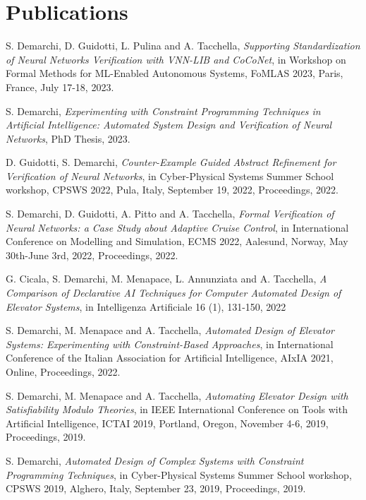\section{\sc Publications}

S. Demarchi, D. Guidotti, L. Pulina and A. Tacchella, 
\textit{Supporting Standardization of Neural Networks Verification
with VNN-LIB and CoCoNet}, in Workshop on Formal Methods for ML-Enabled 
Autonomous Systems, FoMLAS 2023, Paris, France, July 17-18, 2023.

S. Demarchi, \textit{Experimenting with Constraint Programming
	Techniques in Artificial Intelligence: Automated System Design
	and Verification of Neural Networks}, PhD Thesis, 2023.

D. Guidotti, S. Demarchi, \textit{Counter-Example Guided Abstract
	Refinement for Verification of Neural Networks}, in
Cyber-Physical Systems Summer School workshop, CPSWS 2022, Pula, 
Italy, September 19, 2022, Proceedings, 2022.


S. Demarchi, D. Guidotti, A. Pitto and A. Tacchella, \textit{Formal
	 Verification of Neural Networks: a Case Study about Adaptive 
	 Cruise Control}, in International Conference on Modelling and
Simulation, ECMS 2022, Aalesund, Norway, May 30th-June 3rd, 2022,
Proceedings, 2022.

G. Cicala, S. Demarchi, M. Menapace, L. Annunziata and A. Tacchella,
\textit{A Comparison of Declarative AI Techniques for Computer 
	Automated Design of Elevator Systems}, in Intelligenza Artificiale
16 (1), 131-150, 2022

S. Demarchi, M. Menapace and A. Tacchella, \textit{Automated Design 
	of Elevator Systems: Experimenting with Constraint-Based 
	Approaches}, in International Conference of the Italian 
Association for Artificial Intelligence, AIxIA 2021, Online,
Proceedings, 2022.

S. Demarchi, M. Menapace and A. Tacchella, \textit{Automating Elevator 
	Design with Satisfiability Modulo Theories}, in IEEE International 
Conference on Tools with Artificial Intelligence, ICTAI 2019, Portland, 
Oregon, November 4-6, 2019, Proceedings, 2019.

S. Demarchi, \textit{Automated Design of Complex Systems with Constraint 
	Programming Techniques}, in Cyber-Physical Systems Summer School 
workshop, CPSWS 2019, Alghero, Italy, September 23, 2019, Proceedings, 
2019.